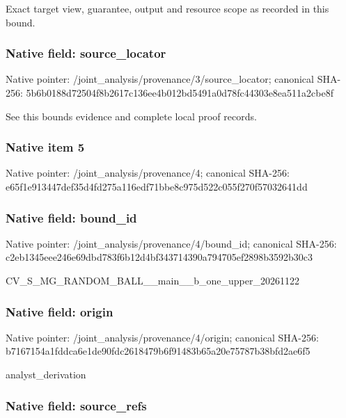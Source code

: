 \documentclass[10pt,a4paper]{article}
\begin{document}
Exact target view, guarantee, output and resource scope as recorded in this bound.


\subsubsection{Native field: source\_locator}


Native pointer: /joint\_analysis/provenan\allowbreak{}ce/3/source\_locator; canonical SHA-256: 5b6b0188d72504f8b2617c13\allowbreak{}6ee4b012bd5491a0d78fc443\allowbreak{}03e8ea511a2cbe8f


See this bounds evidence and complete local proof records.


\subsubsection{Native item 5}


Native pointer: /joint\_analysis/provenance/4; canonical SHA-256: e65f1e913447def35d4fd275\allowbreak{}a116edf71bbe8c975d522c05\allowbreak{}5f270f57032641dd



\subsubsection{Native field: bound\_id}


Native pointer: /joint\_analysis/provenance/4/bound\_id; canonical SHA-256: c2eb1345eee246e69dbd783f\allowbreak{}6b12d4bf343714390a794705\allowbreak{}ef2898b3592b30c3


CV\_S\_MG\_RANDOM\_BALL\_\_mai\allowbreak{}n\_\_b\_one\_upper\_20261122


\subsubsection{Native field: origin}


Native pointer: /joint\_analysis/provenance/4/origin; canonical SHA-256: b7167154a1fddca6e1de90fd\allowbreak{}c2618479b6f91483b65a20e7\allowbreak{}5787b38bfd2ae6f5


analyst\_derivation


\subsubsection{Native field: source\_refs}
\end{document}
